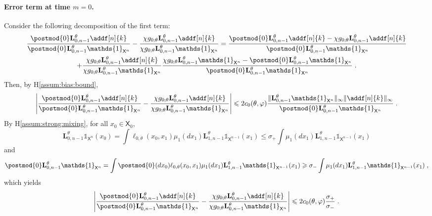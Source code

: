 \documentclass{article}
\newcommand{\uksymbol}{\ell}
\newcommand{\ud}[1]{\uksymbol_{#1}}
\newcommand{\1}{\mathbbm{1}}
\newcommand{\uk}[1]{\mathbf{L}_{#1}}
\newcommand{\Xset}{\mathsf{X}}
\newcommand{\md}[1]{g_{#1}}
\newcommand{\parvec}{\theta}
\def\1{\mathds{1}}
\newcommand{\eqsp}{\;}
\begin{document}
\paragraph{Error term at time $m=0$. }Consider the following decomposition of the first term:
\begin{multline*}
\frac{\postmod{0} \uk{0, n - 1}^\theta \addf[n]{k}}{\postmod{0} \uk{0, n - 1}^\theta \1_{\Xset^n}} - \frac{\chi \md{0;\parvec}\uk{0, n - 1}^\theta \addf[n]{k}}{\chi\md{0;\parvec}\uk{0, n - 1}^\theta \1_{\Xset^n}} = \frac{\postmod{0} \uk{0, n - 1}^\theta \addf[n]{k}-\chi \md{0;\parvec}\uk{0, n - 1}^\theta \addf[n]{k}}{\postmod{0} \uk{0, n - 1}^\theta \1_{\Xset^n}} \\
+  \frac{\chi \md{0;\parvec}\uk{0, n - 1}^\theta \addf[n]{k}}{\chi\md{0;\parvec}\uk{0, n - 1}^\theta \1_{\Xset^n}}\frac{\chi \md{0;\parvec}\uk{0, n - 1}^\theta \1_{\Xset^n} - \postmod{0} \uk{0, n - 1}^\theta \1_{\Xset^n}}{\postmod{0} \uk{0, n - 1}^\theta \1_{\Xset^n}} \eqsp.
\end{multline*}
Then, by H\ref{assum:bias:bound},
$$
\left|\frac{\postmod{0} \uk{0, n - 1}^\theta \addf[n]{k}}{\postmod{0} \uk{0, n - 1}^\theta \1_{\Xset^n}} - \frac{\chi \md{0;\parvec}\uk{0, n - 1}^\theta \addf[n]{k}}{\chi\md{0;\parvec}\uk{0, n - 1}^\theta \1_{\Xset^n}}\right|\leqslant 2c_0(\theta,\varphi)\frac{\| \uk{0, n - 1}^\theta \1_{\Xset^n}\|_\infty\|\addf[n]{k}\|_\infty}{\postmod{0} \uk{0, n - 1}^\theta \1_{\Xset^n}}\eqsp.
$$
By H\ref{assum:strong:mixing}, for all $x_0\in \Xset_0$,
$$
\uk{0, n - 1}^\theta \1_{\Xset^n}(x_0) = \int  \ud{0,\parvec}(x_0, x_{1})\mu_1(d x_1)\uk{1, n - 1}^\theta \1_{\Xset^{n-1}}(x_1)\leqslant \sigma_+  \int \mu_1(d x_1)\uk{1, n - 1}^\theta \1_{\Xset^{n-1}}(x_1)
$$
and 
$$
\postmod{0} \uk{0, n - 1}^\theta \1_{\Xset^n} = \int \postmod{0} (dx_0)\ud{0,\parvec}(x_0, x_{1})\mu_1(d x_1)\uk{1, n - 1}^\theta \1_{\Xset^{n-1}}(x_1)\geqslant \sigma_-  \int \mu_1(d x_1)\uk{1, n - 1}^\theta \1_{\Xset^{n-1}}(x_1)\eqsp,
$$
which yields
$$
\left|\frac{\postmod{0} \uk{0, n - 1}^\theta \addf[n]{k}}{\postmod{0} \uk{0, n - 1}^\theta \1_{\Xset^n}} - \frac{\chi \md{0;\parvec}\uk{0, n - 1}^\theta \addf[n]{k}}{\chi\md{0;\parvec}\uk{0, n - 1}^\theta \1_{\Xset^n}}\right|\leqslant 2c_0(\theta,\varphi)\frac{\sigma_+}{\sigma_-}\eqsp.
$$

\clearpage
\newpage
\end{document}

